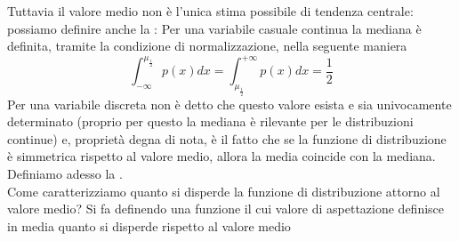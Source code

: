 \documentclass{report}
\begin{document}
\noindent Tuttavia il valore medio non è l'unica stima possibile di tendenza centrale: possiamo definire anche la \emph{}:
\noindent Per una variabile casuale continua la mediana è definita, tramite la condizione di normalizzazione, nella seguente maniera
$$
	\int_{-\infty}^{\mu_{\frac{1}{2}}} p(x)dx = \int_{\mu_{\frac{1}{2}}}^{+\infty} p(x)dx = \frac{1}{2}
$$
Per una variabile discreta non è detto che questo valore esista e sia univocamente determinato (proprio per questo la mediana è rilevante per le distribuzioni continue) e, proprietà degna di nota, è il fatto che se la funzione di distribuzione è simmetrica rispetto al valore medio, allora la media coincide con la mediana. Definiamo adesso la 
. \\
Come caratterizziamo quanto si disperde la funzione di distribuzione attorno al valore medio? Si fa definendo una funzione  il cui valore di aspettazione definisce in media quanto si disperde rispetto al valore medio 







\pagebreak
\printindex
\end{document}
